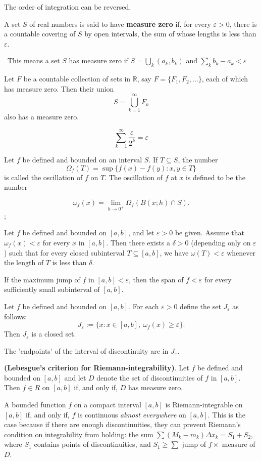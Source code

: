 \documentclass[10pt,a4paper]{book}
\begin{document}
\PP The order of integration can be reversed.
\begin{deff}
A set $S$ of real numbers is said to have \textbf{measure zero} if, for every
$\varepsilon > 0$, there is a countable covering of $S$ by open intervals, the sum of whose lengths is less than $\varepsilon$.
\end{deff}
\
This means a set $S$ has measure zero if $S = \bigcup_k (a_k, b_k)$ and $\sum_k b_k - a_k < \varepsilon$

\begin{Thm}
Let $F$ be a countable collection of sets in $\mathbb{R}$, say $F= \{F_1,F_2,\dots \}$,
each of which has measure zero. Then their union
$$S = \bigcup_{k=1}^\infty F_k$$
also has a measure zero.
\end{Thm}
\PP $$\sum_{k=1}^\infty \dfrac{\varepsilon}{2^k} = \varepsilon$$

\begin{deff}
Let $f$ be defined and bounded on an interval $S$. If $T \subseteq S$, the
number
$$\Omega_f(T) =  \sup \{f(x) - f(y): x,y \in T\}$$
is called the oscillation of $f$ on $T$. The oscillation of $f$ at $x$ is defined to be the number

$$\omega_f(x) = \lim_{h \rightarrow 0^+} \Omega_f(B(x;h) \cap S).$$;
\end{deff}
\begin{Thm}
Let $f$ be defined and bounded on $[a, b]$, and let $\varepsilon > 0$ be given.
Assume that $\omega_f(x) < \varepsilon$ for every $x$ in $[a, b]$. Then there exists a $\delta >0$  (depending only on $\varepsilon$) such that for every closed subinterval $T \subseteq [a, b]$, we have $\omega(T) < \varepsilon$
whenever the length of $T$ is less than $\delta$.

\end{Thm}
\PP If the maximum jump of $f$ in $[a,b] < \varepsilon$, then the span of $f  < \varepsilon$ for every sufficiently small subinterval of $[a,b]$.

\begin{Thm}
Let $f$ be defined and bounded on $[a, b]$. For each $ \varepsilon > 0$ define the set $J_\varepsilon$ as follows:
$$J_\varepsilon := \{x: x \in [a,b],\  \omega_f(x)\geq \varepsilon \}.$$
Then $J_\varepsilon$ is a closed set.

\end{Thm}
The 'endpoints' of the interval of discontinuity are in $J_\varepsilon$.

\begin{Thm}
 \textbf{(Lebesgue's criterion for Riemann-integrability)}. Let $f$ be defined
and bounded on $[a, b]$ and let $D$ denote the set of discontinuities of $f$ in $[a, b]$. Then $f \in R$ on $[a, b]$ if, and only if, $D$ has measure zero.
\end{Thm}
\PP A bounded function $f$ on a compact interval $[a, b]$ is Riemann-integrable on $[a, b]$ if, and only if, $f$ is continuous \textit{almost everywhere} on $[a,b].$ This is the case because if there are enough discontinuities, they can prevent Riemann's condition on integrability from holding: the sum $\sum (M_k - m_k)\Delta x_k = S_1 + S_2$, where $S_1$ contains points of discontinuities,  and $S_1 \geq \sum $ jump of $f \times$ measure of $D$. 
\end{document}
